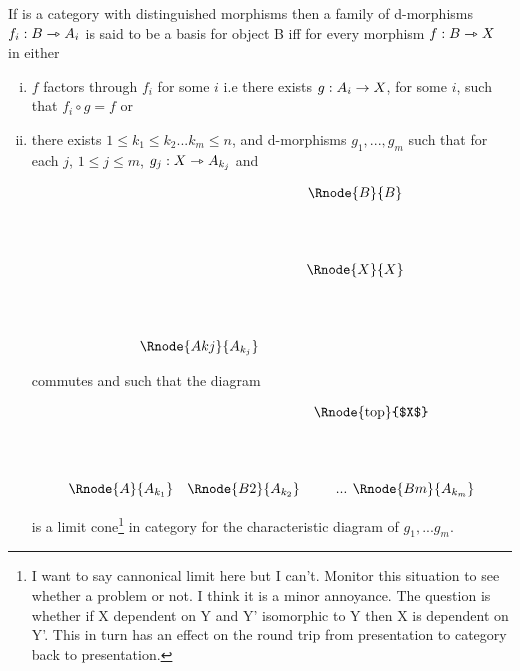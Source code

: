 \documentclass[10pt,a4paper]{scrartcl}
\begin{document}
\begin{definition}
If  is a category with distinguished morphisms then a family of 
d-morphisms  $f_i: B \rightarrowtriangle A_i$ is said to
be a basis for object B iff for every morphism $f: B \rightarrowtriangle X$ in  either 
\begin{enumerate}[(i)]
\item
$f$ factors through  $f_i$ for some $i$ i.e there exists $g:A_i \rightarrow X$, for some $i$, such that $f_i \circ g = f$ or
\item
there exists $1 \leq k_1 \leq k_2 ... k_m \leq n$, and d-morphisms 
$g_1,...,g_m$ such that for each $j$, $1 \leq j \leq m$, 
$g_j: X \rightarrowtriangle A_{k_j}$ and

\begin{center}
\setlength{\arraycolsep}{0.3cm}
\begin{displaymath}
\begin{array}{cp{0.5cm}c}
&&\Rnode{B}{B}\\ [1.5cm]
&&\Rnode{X}{X}\\ [1.5cm]
\Rnode{Akj}{A_{k_j}}&&\\
\end{array}
\end{displaymath}
\setlength{\sarnodesepB}{4pt}
\end{center}
commutes and such that the diagram

\begin{center}
\setlength{\arraycolsep}{0.3cm}
\begin{displaymath}
\begin{array}{ccp{0.2cm}p{0.075cm}c}
&&\Rnode{top}{$X$}& & \\[1.5cm]
\Rnode{A}{A_{k_1}}&\Rnode{B2}{A_{k_2}}&& ... & \Rnode{Bm}{A_{k_m}}\\
\end{array}
\end{displaymath}
\end{center}

is a limit cone\footnote{I want to say cannonical limit here but I can't.
Monitor this situation to see whether a problem or not. I think it is a minor annoyance. The question is whether if X dependent on Y and Y' isomorphic to Y then X is dependent on Y'. This in turn has an effect on the round trip from presentation to category back to presentation. } in category  for the characteristic diagram of $g_1,...g_m$.
\end{enumerate}

\end{definition}
\end{document}
